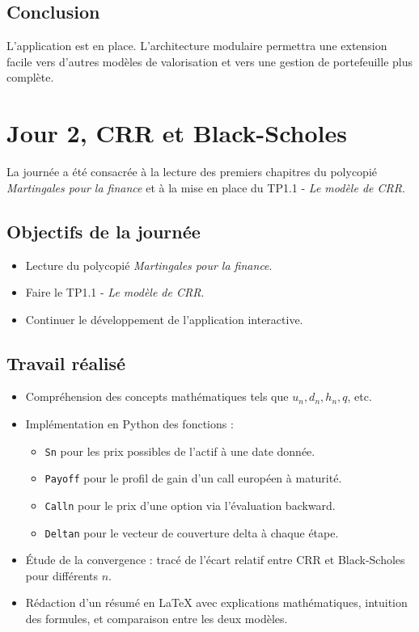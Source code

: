 \documentclass[a4paper,11pt]{article}
\begin{document}
\subsection{Conclusion}
L’application est en place. L’architecture modulaire permettra une extension facile vers d'autres modèles de valorisation et vers une gestion de portefeuille plus complète.

\newpage


\section{Jour 2, CRR et Black-Scholes}
La journée a été consacrée à la lecture des premiers chapitres du polycopié \textit{Martingales pour la finance} et à la mise en place du TP1.1 - \textit{Le modèle de CRR}.

\subsection{Objectifs de la journée}
\begin{itemize}
    \item Lecture du polycopié \textit{Martingales pour la finance}.
    \item Faire le TP1.1 - \textit{Le modèle de CRR}.
    \item Continuer le développement de l’application interactive.
\end{itemize}
\subsection{Travail réalisé}
\begin{itemize}
    \item Compréhension des concepts mathématiques tels que \( u_n, d_n, h_n, q \), etc.
    \item Implémentation en Python des fonctions :
    \begin{itemize}
        \item \texttt{Sn} pour les prix possibles de l’actif à une date donnée.
        \item \texttt{Payoff} pour le profil de gain d’un call européen à maturité.
        \item \texttt{Calln} pour le prix d’une option via l’évaluation backward.
        \item \texttt{Deltan} pour le vecteur de couverture delta à chaque étape.
    \end{itemize}
    \item Étude de la convergence : tracé de l’écart relatif entre CRR et Black-Scholes pour différents \( n \).
    \item Rédaction d’un résumé en {\LaTeX} avec explications mathématiques, intuition des formules, et comparaison entre les deux modèles.
\end{itemize}
\end{document}

